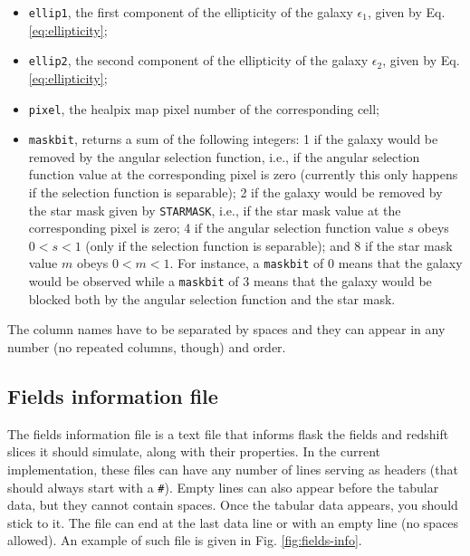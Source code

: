\documentclass[12pt]{book} %
\begin{document}
\begin{itemize}
\begin{itemize}
  \item {\tt ellip1}, the first component of the ellipticity of the galaxy $\epsilon_1$, 
    given by Eq. \ref{eq:ellipticity}; 
  \item {\tt ellip2}, the second component of the ellipticity of the galaxy $\epsilon_2$, 
    given by Eq. \ref{eq:ellipticity};
  \item {\tt pixel}, the {\sc healpix} map pixel number of the corresponding cell; 
  \item {\tt maskbit}, returns a sum of the following integers: 1 if the galaxy would 
    be removed by the angular selection function, i.e., if the angular selection function value 
    at the corresponding pixel is zero (currently this only happens if the selection function 
    is separable); 2 if the galaxy would be removed by the star mask given by {\tt STARMASK}, 
    i.e., if the star mask value at the corresponding pixel is zero; 4 if the angular selection function 
    value $s$ obeys $0<s<1$ (only if the selection function is separable); and 8 if the star mask 
    value $m$ obeys $0<m<1$. For instance, a {\tt maskbit} of 0 means that the galaxy would be observed 
    while a {\tt maskbit} of 3 means that the galaxy would be blocked both by the angular selection
    function and the star mask.
  \end{itemize}
  The column names have to be separated by spaces and they can appear in any number (no repeated 
  columns, though) and order.
\end{itemize}


\subsection{Fields information file}
\label{sec:fields-info}

The fields information file is a text file that informs {\sc flask} the fields and redshift 
slices it should simulate, along with their properties. In the current implementation, these 
files can have any number of lines serving as headers (that should always start with a {\tt \#}). 
Empty lines can also appear before the tabular data, but they cannot contain spaces. Once 
the tabular data appears, you should stick to it. The file can end at the last data line or 
with an empty line (no spaces allowed). An example of such file is given in Fig. \ref{fig:fields-info}.
\end{document}
